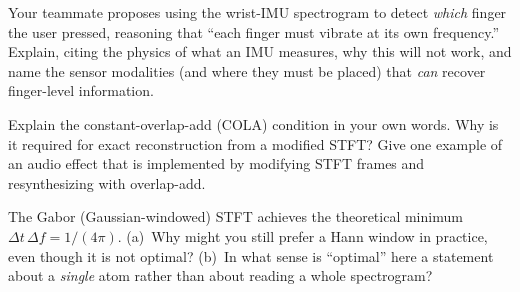 \begin{exercise}
\label{ch10:ex-claims}
Your teammate proposes using the wrist-IMU spectrogram to detect \emph{which}
finger the user pressed, reasoning that ``each finger must vibrate at its own
frequency.'' Explain, citing the physics of what an IMU measures, why this will
not work, and name the sensor modalities (and where they must be placed) that
\emph{can} recover finger-level information.
\end{exercise}

\begin{exercise}
\label{ch10:ex-cola}
Explain the constant-overlap-add (COLA) condition in your own words. Why is it
required for exact reconstruction from a modified STFT? Give one example of an
audio effect that is implemented by modifying STFT frames and resynthesizing with
overlap-add.
\end{exercise}

\begin{exercise}
\label{ch10:ex-gabor}
The Gabor (Gaussian-windowed) STFT achieves the theoretical minimum
$\Delta t\,\Delta f = 1/(4\pi)$. (a)~Why might you still prefer a Hann window in
practice, even though it is not optimal? (b)~In what sense is ``optimal'' here a
statement about a \emph{single} atom rather than about reading a whole
spectrogram?
\end{exercise}
